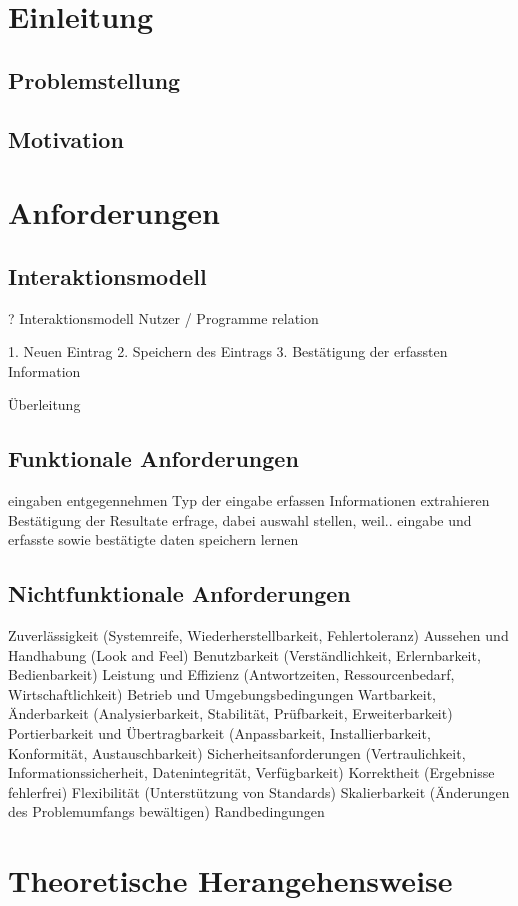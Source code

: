 \chapter{Einleitung}
\section{Problemstellung}
\section{Motivation}

\chapter{Anforderungen}
\section{Interaktionsmodell}
? Interaktionsmodell
Nutzer / Programme relation

1. Neuen Eintrag
2. Speichern des Eintrags
3. Bestätigung der erfassten Information

Überleitung
\section{Funktionale Anforderungen}
eingaben entgegennehmen
Typ der eingabe erfassen
Informationen extrahieren
Bestätigung der Resultate erfrage, dabei auswahl stellen, weil..
eingabe und erfasste sowie bestätigte daten speichern
lernen
\section{Nichtfunktionale Anforderungen}
Zuverlässigkeit (Systemreife, Wiederherstellbarkeit, Fehlertoleranz)
Aussehen und Handhabung (Look and Feel)
Benutzbarkeit (Verständlichkeit, Erlernbarkeit, Bedienbarkeit)
Leistung und Effizienz (Antwortzeiten, Ressourcenbedarf, Wirtschaftlichkeit)
Betrieb und Umgebungsbedingungen
Wartbarkeit, Änderbarkeit (Analysierbarkeit, Stabilität, Prüfbarkeit, Erweiterbarkeit)
Portierbarkeit und Übertragbarkeit (Anpassbarkeit, Installierbarkeit, Konformität, Austauschbarkeit)
Sicherheitsanforderungen (Vertraulichkeit, Informationssicherheit, Datenintegrität, Verfügbarkeit)
Korrektheit (Ergebnisse fehlerfrei)
Flexibilität (Unterstützung von Standards)
Skalierbarkeit (Änderungen des Problemumfangs bewältigen)
Randbedingungen


\chapter{Theoretische Herangehensweise}
